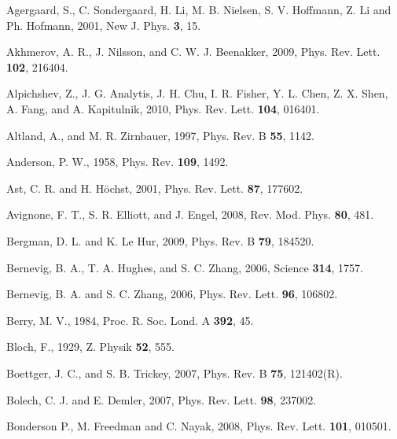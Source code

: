 \documentclass[twocolumn,floatfix,showpacs,rmp,aps]{revtex4}
\begin{document}

\begin{thebibliography}{99}

Agergaard, S., C. Sondergaard, H. Li, M. B. Nielsen, S. V. Hoffmann,
Z. Li and Ph. Hofmann, 2001,
New J. Phys. {\bf 3}, 15.

Akhmerov, A. R., J. Nilsson, and C. W. J. Beenakker, 2009,
Phys. Rev. Lett. {\bf 102}, 216404.

Alpichshev, Z., J. G. Analytis, J. H. Chu, I. R. Fisher, Y. L. Chen, Z. X. Shen,
A. Fang, and A. Kapitulnik, 2010,
Phys. Rev. Lett. {\bf 104}, 016401.

Altland, A., and M. R. Zirnbauer, 1997,
Phys. Rev. B {\bf 55}, 1142.

Anderson, P. W., 1958,
Phys. Rev. {\bf 109}, 1492.

Ast, C. R.  and H. H\"ochst, 2001,
Phys. Rev. Lett. {\bf 87}, 177602.

Avignone, F. T., S. R. Elliott, and J. Engel, 2008,
Rev. Mod. Phys. {\bf 80}, 481.

Bergman, D. L. and K. Le Hur, 2009,
Phys. Rev. B {\bf 79}, 184520.

Bernevig, B. A., T. A. Hughes, and S. C. Zhang, 2006,
Science {\bf 314}, 1757.

Bernevig, B. A. and S. C. Zhang, 2006,
Phys. Rev. Lett. {\bf 96}, 106802.

Berry, M. V., 1984,
Proc. R. Soc. Lond. A {\bf 392}, 45.

Bloch, F., 1929,
Z. Physik {\bf 52}, 555.

Boettger, J. C., and S. B. Trickey, 2007,
Phys. Rev. B {\bf 75}, 121402(R).

Bolech, C. J. and E. Demler, 2007,
Phys. Rev. Lett. {\bf 98}, 237002.

Bonderson P., M. Freedman and C. Nayak, 2008,
Phys. Rev. Lett. {\bf 101}, 010501.


\end{thebibliography}
\end{document}
